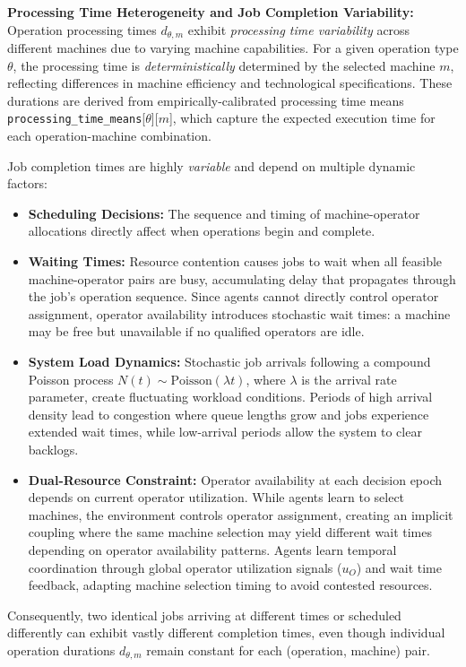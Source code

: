 \textbf{Processing Time Heterogeneity and Job Completion Variability:}
Operation processing times \( d_{\theta,m} \) exhibit \textit{processing time variability} across different machines due to varying machine capabilities. For a given operation type \( \theta \), the processing time is \textit{deterministically} determined by the selected machine \( m \), reflecting differences in machine efficiency and technological specifications. These durations are derived from empirically-calibrated processing time means \texttt{processing\_time\_means}[\(\theta\)][\(m\)], which capture the expected execution time for each operation-machine combination.

Job completion times are highly \textit{variable} and depend on multiple dynamic factors:
\begin{itemize}
    \item \textbf{Scheduling Decisions:} The sequence and timing of machine-operator allocations directly affect when operations begin and complete.
    \item \textbf{Waiting Times:} Resource contention causes jobs to wait when all feasible machine-operator pairs are busy, accumulating delay that propagates through the job's operation sequence. Since agents cannot directly control operator assignment, operator availability introduces stochastic wait times: a machine may be free but unavailable if no qualified operators are idle.
    \item \textbf{System Load Dynamics:} Stochastic job arrivals following a compound Poisson process \( N(t) \sim \text{Poisson}(\lambda t) \), where \( \lambda \) is the arrival rate parameter, create fluctuating workload conditions. Periods of high arrival density lead to congestion where queue lengths grow and jobs experience extended wait times, while low-arrival periods allow the system to clear backlogs.
    \item \textbf{Dual-Resource Constraint:} Operator availability at each decision epoch depends on current operator utilization. While agents learn to select machines, the environment controls operator assignment, creating an implicit coupling where the same machine selection may yield different wait times depending on operator availability patterns. Agents learn temporal coordination through global operator utilization signals (\( u_O \)) and wait time feedback, adapting machine selection timing to avoid contested resources.
\end{itemize}

Consequently, two identical jobs arriving at different times or scheduled differently can exhibit vastly different completion times, even though individual operation durations \( d_{\theta,m} \) remain constant for each (operation, machine) pair.

